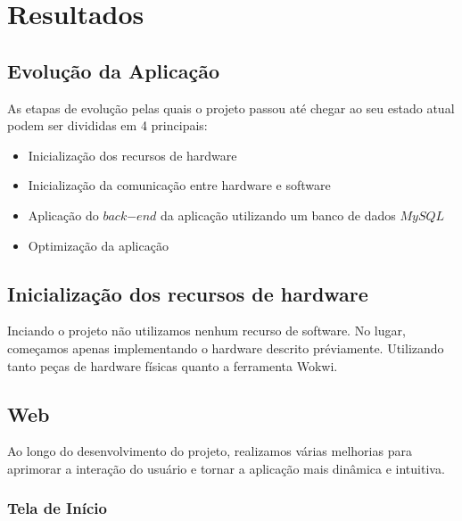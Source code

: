 \documentclass[conference, a4paper, 12pt]{IEEEtran}
\begin{document}
\section{Resultados}
\label{sec:results}
\subsection{Evolução da Aplicação}
As etapas de evolução pelas quais o projeto passou até chegar ao seu estado atual podem ser divididas em 4 principais:
\begin{itemize}
  \item Inicialização dos recursos de hardware
  \item Inicialização da comunicação entre hardware e software
  \item Aplicação do $back$$-$$end$ da aplicação utilizando um banco de dados $MySQL$
  \item Optimização da aplicação
\end{itemize}

\subsection{Inicialização dos recursos de hardware}
Inciando o projeto não utilizamos nenhum recurso de software. No lugar, começamos apenas implementando o hardware descrito préviamente. Utilizando tanto peças de hardware físicas quanto a ferramenta Wokwi.

\subsection{Web}

Ao longo do desenvolvimento do projeto, realizamos várias melhorias para aprimorar a interação do usuário e tornar a aplicação mais dinâmica e intuitiva.
\vspace{10pt}
\subsubsection{Tela de Início}
\end{document}
